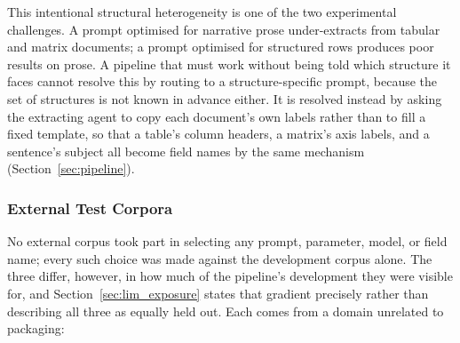 \documentclass[11pt]{article}
\begin{document}
This intentional structural heterogeneity is one of the two experimental
challenges. A prompt optimised for narrative prose under-extracts from tabular
and matrix documents; a prompt optimised for structured rows produces poor
results on prose. A pipeline that must work without being told which structure
it faces cannot resolve this by routing to a structure-specific prompt, because
the set of structures is not known in advance either. It is resolved instead by
asking the extracting agent to copy each document's own labels rather than to
fill a fixed template, so that a table's column headers, a matrix's axis labels,
and a sentence's subject all become field names by the same mechanism
(Section~\ref{sec:pipeline}).

\subsubsection{External Test Corpora}
\label{sec:external_corpora}
No external corpus took part in selecting any prompt, parameter, model, or field
name; every such choice was made against the development corpus alone. The three
differ, however, in how much of the pipeline's development they were visible
for, and Section~\ref{sec:lim_exposure} states that gradient precisely rather
than describing all three as equally held out. Each comes from a domain
unrelated to packaging:
\end{document}
